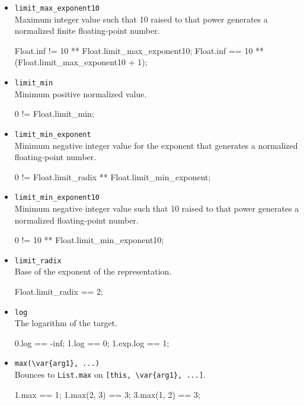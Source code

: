 \begin{itemize}
\item \lstinline|limit_max_exponent10|\\
  Maximum integer value such that 10 raised to that power generates a
  normalized finite floating-point number.
\begin{urbiassert}[firstnumber=last]
Float.inf != 10 ** Float.limit_max_exponent10;
Float.inf == 10 ** (Float.limit_max_exponent10 + 1);
\end{urbiassert}

\item \lstinline|limit_min|\\
  Minimum positive normalized value.
\begin{urbiassert}[firstnumber=last]
0 != Float.limit_min;
\end{urbiassert}

\item \lstinline|limit_min_exponent|\\
  Minimum negative integer value for the exponent that generates a
  normalized floating-point number.
\begin{urbiassert}[firstnumber=last]
0 != Float.limit_radix ** Float.limit_min_exponent;
\end{urbiassert}

\item \lstinline|limit_min_exponent10|\\
  Minimum negative integer value such that 10 raised to that power
  generates a normalized floating-point number.
\begin{urbiassert}[firstnumber=last]
0 != 10 ** Float.limit_min_exponent10;
\end{urbiassert}

\item \lstinline|limit_radix|\\
  Base of the exponent of the representation.
\begin{urbiassert}[firstnumber=last]
Float.limit_radix == 2;
\end{urbiassert}

\item \lstinline|log|\\
  The logarithm of the target.
\begin{urbiassert}[firstnumber=last]
0.log == -inf;
1.log == 0;
1.exp.log == 1;
\end{urbiassert}

\item \lstinline|max(\var{arg1}, ...)|\\
  Bounces to \lstinline|List.max| on \lstinline|[this, \var{arg1}, ...]|.
\begin{urbiassert}[firstnumber=last]
1.max == 1;
1.max(2, 3) == 3;
3.max(1, 2) == 3;
\end{urbiassert}


\end{itemize}
